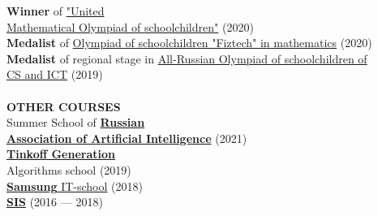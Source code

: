 \documentclass{article}
\begin{document}
\begin{vwcol}[widths={0.8,0.2},
 sep=.8cm, justify=flush,rule=0pt,indent=1em]
\textbf{Winner} of \href{https://olympiads.mccme.ru/ommo/23/}{"United\\Mathematical Olympiad of schoolchildren"} (2020)\\
\textbf{Medalist} of \href{https://olymp.mipt.ru/}{Olympiad of schoolchildren "Fiztech" in mathematics} (2020)\\
\textbf{Medalist} of regional stage in \href{https://vos.olimpiada.ru/}{All-Russian Olympiad of schoolchildren of\\
 CS and ICT} (2019)\\
\\
\noindent\textcolor[rgb]{0.1255,0.2902,0.7843}{\textbf{OTHER COURSES}}\\
Summer School of \href{https://raai.space/}{\textbf{Russian\\
Association of Artificial Intelligence}} (2021)\\
\href{https://fintech.tinkoff.ru/school/generation/}{\textbf{Tinkoff Generation}}\\
Algorithms school (2019)\\
\href{https://myitschool.ru/}{\textbf{Samsung} IT-school} (2018)\\
\href{https://lksh.ru/}{\textbf{SIS}} (2016 — 2018)\\
\end{vwcol} 
\end{document}
